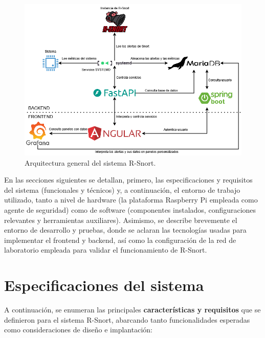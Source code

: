 \documentclass[11pt,a4paper,twoside]{report}
\begin{document}
\begin{figure}[hbtp]
	\centering
	 \includegraphics[width=1\textwidth]{documento/5.png}
	\caption{Arquitectura general del sistema R-Snort.}
	\label{fig:arquitectura-general}
\end{figure}

En las secciones siguientes se detallan, primero, las especificaciones y requisitos del sistema (funcionales y técnicos) y, a continuación, el entorno de trabajo utilizado, tanto a nivel de hardware (la plataforma Raspberry Pi empleada como agente de seguridad) como de software (componentes instalados, configuraciones relevantes y herramientas auxiliares). Asimismo, se describe brevemente el entorno de desarrollo y pruebas, donde se aclaran las tecnologías usadas para implementar el frontend y backend, así como la configuración de la red de laboratorio empleada para validar el funcionamiento de R-Snort.\newline

\section{Especificaciones del sistema}
A continuación, se enumeran las principales \textbf{características y requisitos} que se definieron para el sistema R-Snort, abarcando tanto funcionalidades esperadas como consideraciones de diseño e implantación:\newline
\end{document}
